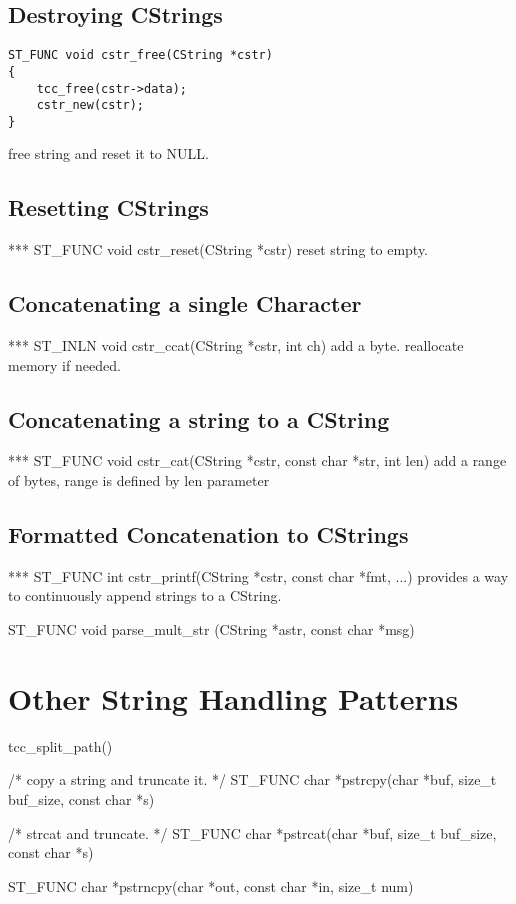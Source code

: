 \subsection{Destroying CStrings}

\begin{verbatim}
ST_FUNC void cstr_free(CString *cstr)
{
    tcc_free(cstr->data);
    cstr_new(cstr);
}
\end{verbatim}
free string and reset it to NULL.

\subsection{Resetting CStrings}

*** ST\_FUNC void cstr\_reset(CString *cstr)
reset string to empty.

\subsection{Concatenating a single Character}

*** ST\_INLN void cstr\_ccat(CString *cstr, int ch)
add a byte. reallocate memory if needed.

\subsection{Concatenating a string to a CString}

*** ST\_FUNC void cstr\_cat(CString *cstr, const char *str, int len)
add a range of bytes, range is defined by len parameter

\subsection{Formatted Concatenation to CStrings}

*** ST\_FUNC int cstr\_printf(CString *cstr, const char *fmt, ...)
provides a way to continuously append strings to a CString.


ST\_FUNC void parse\_mult\_str (CString *astr, const char *msg)


\section{Other String Handling Patterns}

tcc\_split\_path()



/* copy a string and truncate it. */
ST\_FUNC char *pstrcpy(char *buf, size\_t buf\_size, const char *s)


/* strcat and truncate. */
ST\_FUNC char *pstrcat(char *buf, size\_t buf\_size, const char *s)


ST\_FUNC char *pstrncpy(char *out, const char *in, size\_t num)

